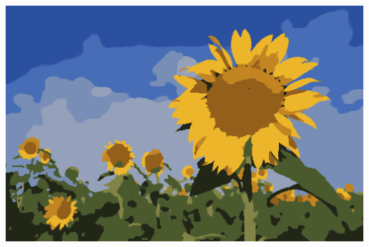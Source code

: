 \begin{frame}
{\begin{minipage}[t][0.25\textheight][t]{\textwidth}
\begin{minipage}{.3\textwidth}
\end{minipage}
\begin{minipage}{.3\textwidth}
\center
\includegraphics[scale=0.15]{figures/motivation/pock-segmentation.png}
\end{minipage}
\end{minipage}}
%
%
\end{frame}

